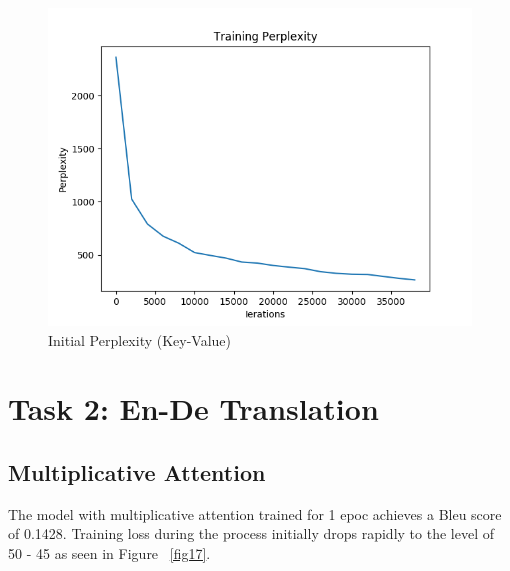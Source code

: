 \documentclass[11pt,a4paper]{article}
\begin{document}
\begin{figure}[!htbp]
\includegraphics[width=\linewidth]{hi_key-value_ppl_1.png}
\caption{Initial Perplexity (Key-Value)}
\label{fig15}
\end{figure}



\section{Task 2: En-De Translation}

\subsection{Multiplicative Attention}
The model with multiplicative attention trained for 1 epoc achieves a Bleu score of 0.1428.
Training loss during the process initially drops rapidly to the level of 50 - 45 as seen in Figure ~\ref{fig17}. 
\end{document}
